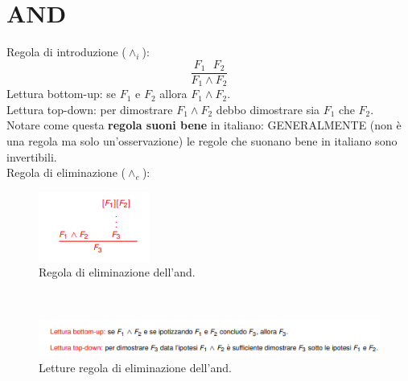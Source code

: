 \documentclass[12pt]{article}
\begin{document}
\section{AND}
Regola di introduzione ($\wedge_i$):
\begin{equation}
    \dfrac{F_1 \text{ } F_2}{F_1 \wedge F_2}
\end{equation}
Lettura bottom-up: se $F_1$ e $F_2$ allora $F_1 \wedge F_2$.\\
Lettura top-down: per dimostrare $F_1 \wedge F_2$ debbo dimostrare sia $F_1$ che $F_2$.\\
Notare come questa \textbf{regola suoni bene} in italiano: GENERALMENTE (non è una regola ma solo un'osservazione) le regole che suonano bene in italiano sono invertibili.\\
Regola di eliminazione ($\wedge_e$):
\begin{figure}[!htb]
    \centering
    \includegraphics[width=.9\linewidth,height=.40\textheight,keepaspectratio]{brutta/eliminazione_and.png} %
    \begin{center}
        \caption{\label{fig:eliminazione_and}Regola di eliminazione dell'and.} %
    \end{center}
\end{figure}\\
\begin{figure}[!htb]
    \centering
    \includegraphics[width=.9\linewidth,height=.40\textheight,keepaspectratio]{brutta/letture_eliminazione_and.png} %
    \begin{center}
        \caption{\label{fig:lettura_eliminazione_and}Letture regola di eliminazione dell'and.} %
    \end{center}
\end{figure}\\
\end{document}
